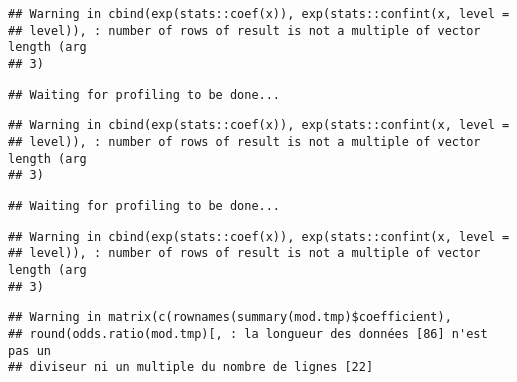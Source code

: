\documentclass[]{article}
\newenvironment{Shaded}{\begin{snugshade}}{\end{snugshade}}
\newcommand{\KeywordTok}[1]{\textcolor[rgb]{0.13,0.29,0.53}{\textbf{#1}}}
\newcommand{\DataTypeTok}[1]{\textcolor[rgb]{0.13,0.29,0.53}{#1}}
\newcommand{\StringTok}[1]{\textcolor[rgb]{0.31,0.60,0.02}{#1}}
\newcommand{\OperatorTok}[1]{\textcolor[rgb]{0.81,0.36,0.00}{\textbf{#1}}}
\newcommand{\NormalTok}[1]{#1}
\begin{document}
\begin{verbatim}
## Warning in cbind(exp(stats::coef(x)), exp(stats::confint(x, level =
## level)), : number of rows of result is not a multiple of vector length (arg
## 3)
\end{verbatim}

\begin{verbatim}
## Waiting for profiling to be done...
\end{verbatim}

\begin{verbatim}
## Warning in cbind(exp(stats::coef(x)), exp(stats::confint(x, level =
## level)), : number of rows of result is not a multiple of vector length (arg
## 3)
\end{verbatim}

\begin{verbatim}
## Waiting for profiling to be done...
\end{verbatim}

\begin{verbatim}
## Warning in cbind(exp(stats::coef(x)), exp(stats::confint(x, level =
## level)), : number of rows of result is not a multiple of vector length (arg
## 3)
\end{verbatim}

\begin{verbatim}
## Warning in matrix(c(rownames(summary(mod.tmp)$coefficient),
## round(odds.ratio(mod.tmp)[, : la longueur des données [86] n'est pas un
## diviseur ni un multiple du nombre de lignes [22]
\end{verbatim}

\begin{Shaded}
\end{Shaded}
\end{document}
